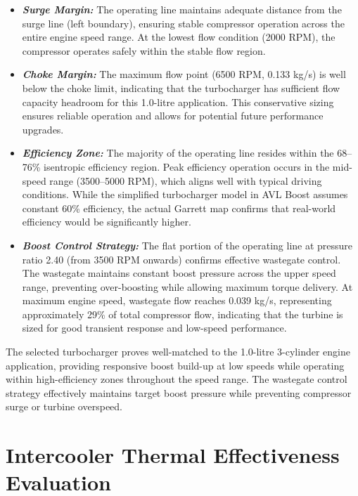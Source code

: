 \begin{itemize}
    \item \textbf{\textit{Surge Margin:}} The operating line maintains adequate distance from the surge line (left boundary), ensuring stable compressor operation across the entire engine speed range. At the lowest flow condition (2000 RPM), the compressor operates safely within the stable flow region.
    
    \item \textbf{\textit{Choke Margin:}} The maximum flow point (6500 RPM, 0.133 kg/s) is well below the choke limit, indicating that the turbocharger has sufficient flow capacity headroom for this 1.0-litre application. This conservative sizing ensures reliable operation and allows for potential future performance upgrades.
    
    \item \textbf{\textit{Efficiency Zone:}} The majority of the operating line resides within the 68--76\% isentropic efficiency region. Peak efficiency operation occurs in the mid-speed range (3500--5000 RPM), which aligns well with typical driving conditions. While the simplified turbocharger model in AVL Boost assumes constant 60\% efficiency, the actual Garrett map confirms that real-world efficiency would be significantly higher.
    
    \item \textbf{\textit{Boost Control Strategy:}} The flat portion of the operating line at pressure ratio 2.40 (from 3500 RPM onwards) confirms effective wastegate control. The wastegate maintains constant boost pressure across the upper speed range, preventing over-boosting while allowing maximum torque delivery. At maximum engine speed, wastegate flow reaches 0.039 kg/s, representing approximately 29\% of total compressor flow, indicating that the turbine is sized for good transient response and low-speed performance.
\end{itemize}

The selected turbocharger proves well-matched to the 1.0-litre 3-cylinder engine application, providing responsive boost build-up at low speeds while operating within high-efficiency zones throughout the speed range. The wastegate control strategy effectively maintains target boost pressure while preventing compressor surge or turbine overspeed.



\section{Intercooler Thermal Effectiveness Evaluation}

